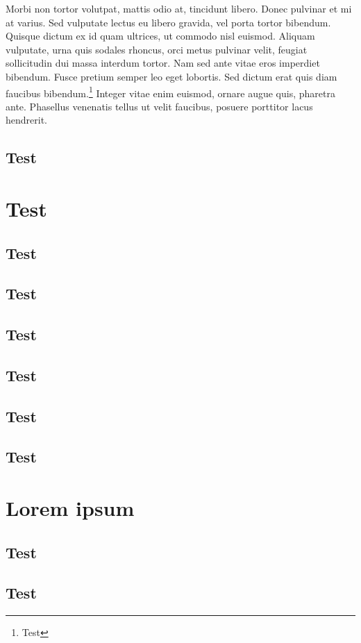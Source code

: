 \documentclass[b5paper,twoside,openright]{scrbook}
\begin{document}
Morbi non tortor volutpat, mattis odio at, tincidunt libero.
Donec pulvinar et mi at varius.
Sed vulputate lectus eu libero gravida, vel porta tortor bibendum.
Quisque dictum ex id quam ultrices, ut commodo nisl euismod.
Aliquam vulputate, urna quis sodales rhoncus, orci metus pulvinar velit, feugiat sollicitudin dui massa interdum tortor.
Nam sed ante vitae eros imperdiet bibendum.
Fusce pretium semper leo eget lobortis.
Sed dictum erat quis diam faucibus bibendum.\footnote{Test}
Integer vitae enim euismod, ornare augue quis, pharetra ante.
Phasellus venenatis tellus ut velit faucibus, posuere porttitor lacus hendrerit.

\subsection{Test}
\section{Test}
\subsection{Test}
\subsection{Test}
\subsection{Test}
\subsection{Test}
\subsection{Test}
\subsection{Test}

\section{Lorem ipsum}

\subsection{Test}
\subsection{Test}
\end{document}
